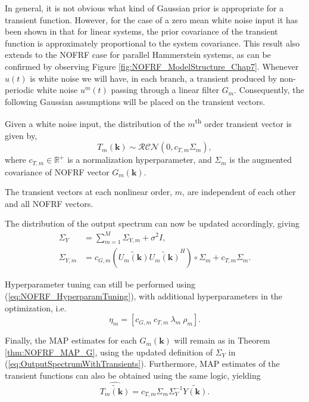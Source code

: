 In general, it is not obvious what kind of Gaussian prior is appropriate for a transient function. However, for the case of a zero mean white noise input it has been shown in \cite{Lataire2016} that for linear systems, the prior covariance of the transient function is approximately proportional to the system covariance. This result also extends to the NOFRF case for parallel Hammerstein systems, as can be confirmed by observing Figure \ref{fig:NOFRF_ModelStructure_Chap7}. Whenever $u(t)$ is white noise we will have, in each branch, a transient produced by non-periodic white noise $u^m(t)$ passing through a linear filter $G_m$. Consequently, the following Gaussian assumptions will be placed on the transient vectors.
\begin{assum}
Given a white noise input, the distribution of the $m$\textsuperscript{th} order transient vector is given by,
\begin{equation}
T_m(\mathbf{k}) \sim \mathcal{RCN}(0,c_{T,m} \Sigma_m),
\end{equation}
where $c_{T,m} \in \mathbb{R}^+$ is a normalization hyperparameter, and $\Sigma_m$ is the augmented covariance of NOFRF vector $G_m(\mathbf{k})$.
\end{assum}
\begin{assum}
The transient vectors at each nonlinear order, $m$, are independent of each other and all NOFRF vectors.
\end{assum}

The distribution of the output spectrum can now be updated accordingly, giving
\begin{equation}
\begin{split}
\label{eq:OutputSpectrumWithTransients}
\Sigma_Y &= \sum_{m=1}^{M} \Sigma_{Y,m} + \sigma^2 I, \\
\Sigma_{Y,m} &= c_{G,m} (\widetilde{U_m(\mathbf{k})} \widetilde{U_m(\mathbf{k})}^H)  \circ \Sigma_m + c_{T,m} \Sigma_m.
\end{split}
\end{equation}

Hyperparameter tuning can still be performed using (\ref{eq:NOFRF_HyperparamTuning}), with additional hyperparameters in the optimization, i.e. $$\eta_m = [c_{G,m} \ c_{T,m} \ \lambda_m \ \rho_m].$$

Finally, the MAP estimates for each $G_m(\mathbf{k})$ will remain as in Theorem \ref{thm:NOFRF_MAP_G}, using the updated definition of $\Sigma_Y$ in (\ref{eq:OutputSpectrumWithTransients}). Furthermore, MAP estimates of the transient functions can also be obtained using the same logic, yielding
\begin{equation}
\hat{\widetilde{T_m(\mathbf{k})}} = c_{T,m} \Sigma_m  \Sigma_Y^{-1} \widetilde{Y(\mathbf{k})}.
\end{equation} 

